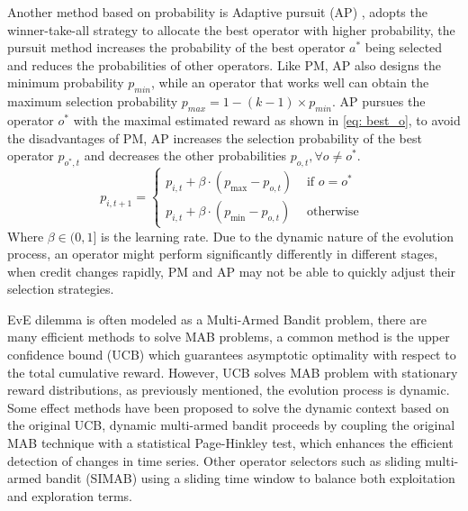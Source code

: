 \documentclass[journal]{IEEEtran}
\begin{document}
Another method based on probability is Adaptive pursuit (AP) \cite{thierens2007adaptive}, adopts the winner-take-all strategy to allocate the best operator with higher probability, the pursuit method increases the probability of the best operator $a^*$ being selected and reduces the probabilities of other operators.
Like PM, AP also designs the minimum probability $p_{min}$, while an operator that works well can obtain the maximum selection probability $p_{max} = 1-(k-1)\times p_{min}$.
AP pursues the operator $o^*$ with the maximal estimated reward as shown in \ref{eq: best_o}, to avoid the disadvantages of PM, AP increases the selection probability of the best operator $p_{o^*,t}$ and decreases the other probabilities $p_{o,t}, \forall o \neq o^*$.
\begin{equation}
  p_{i, t+1}=\left\{\begin{array}{ll}
    p_{i, t}+\beta \cdot\left(p_{\max }-p_{o, t}\right) & \text { if } o=o^{*} \\
    p_{i, t}+\beta \cdot\left(p_{\min }-p_{o, t}\right) & \text { otherwise }
  \end{array}\right.
  \label{eq: AP}
\end{equation}
Where $\beta \in (0,1]$ is the learning rate.
Due to the dynamic nature of the evolution process, an operator might perform significantly differently in different stages, when credit changes rapidly, PM and AP may not be able to quickly adjust their selection strategies.

EvE dilemma is often modeled as a Multi-Armed Bandit problem, there are many efficient methods to solve MAB problems,
a common method is the upper confidence bound (UCB) \cite{auer2002finite} which guarantees asymptotic optimality with respect to the total cumulative reward. However, UCB solves MAB problem with stationary reward distributions, as previously mentioned, the evolution process is dynamic.
Some effect methods have been proposed to solve the dynamic context based on the original UCB, dynamic multi-armed bandit \cite{dacosta2008adaptive} proceeds by coupling the original MAB technique with a statistical Page-Hinkley test, which enhances the efficient detection of changes in time series.
Other operator selectors such as sliding multi-armed bandit (SIMAB) \cite{fialho2010analyzing} using a sliding time window to balance both exploitation and exploration terms.
\end{document}
